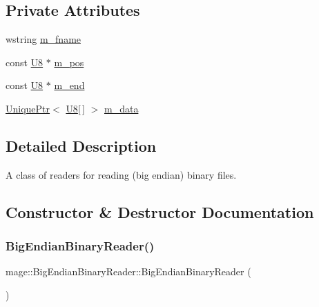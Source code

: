 \subsection*{Private Attributes}
\begin{DoxyCompactItemize}
\item 
wstring \mbox{\hyperlink{classmage_1_1_big_endian_binary_reader_a0f836aec582a59f156b64bffb9653e41}{m\+\_\+fname}}
\item 
const \mbox{\hyperlink{namespacemage_afc638980bc6154f15af5e2d93a0e0ea9}{U8}} $\ast$ \mbox{\hyperlink{classmage_1_1_big_endian_binary_reader_a7dbfc5ce1712e431f75d80a4f7a56e33}{m\+\_\+pos}}
\item 
const \mbox{\hyperlink{namespacemage_afc638980bc6154f15af5e2d93a0e0ea9}{U8}} $\ast$ \mbox{\hyperlink{classmage_1_1_big_endian_binary_reader_ab4f707d30799b98afed0f9adfc27a3e2}{m\+\_\+end}}
\item 
\mbox{\hyperlink{namespacemage_a3316d7143a973e37adf1110f2e80ca31}{Unique\+Ptr}}$<$ \mbox{\hyperlink{namespacemage_afc638980bc6154f15af5e2d93a0e0ea9}{U8}}\mbox{[}$\,$\mbox{]} $>$ \mbox{\hyperlink{classmage_1_1_big_endian_binary_reader_a54128bdaa233c1bd20494189b2397fe3}{m\+\_\+data}}
\end{DoxyCompactItemize}


\subsection{Detailed Description}
A class of readers for reading (big endian) binary files. 

\subsection{Constructor \& Destructor Documentation}
\mbox{\label{classmage_1_1_big_endian_binary_reader_a1fd0dbee6950a8cb04aa399f0cdbaf2a}} 
\subsubsection{\texorpdfstring{Big\+Endian\+Binary\+Reader()}{BigEndianBinaryReader()}\hspace{0.1cm}{\footnotesize\ttfamily [1/3]}}
{\footnotesize\ttfamily mage\+::\+Big\+Endian\+Binary\+Reader\+::\+Big\+Endian\+Binary\+Reader (\begin{DoxyParamCaption}{ }\end{DoxyParamCaption})\hspace{0.3cm}{\ttfamily [protected]}}

